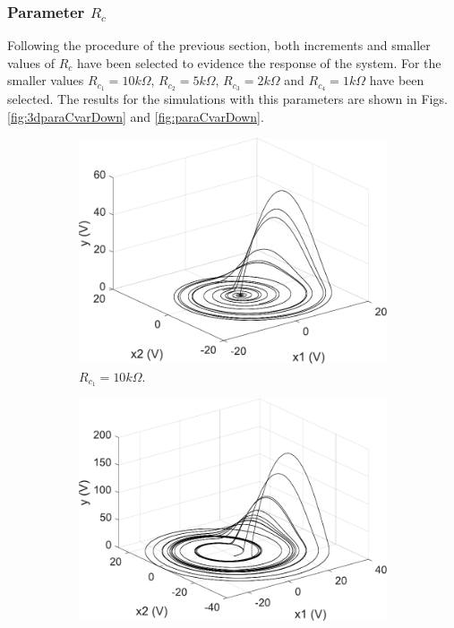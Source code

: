     \subsubsection{Parameter \texorpdfstring{$R_c$}{Rc}}\label{subsubsec:varparaC}
    Following the procedure of the previous section, both increments and smaller values of $R_c$ have been selected to evidence the response of the system. For the smaller values $R_{c_1}=10k\Omega$, $R_{c_2}=5k\Omega$, $R_{c_3}=2k\Omega$ and $R_{c_4}=1k\Omega$ have been selected. The results for the simulations with this parameters are shown in Figs. \ref{fig:3dparaCvarDown} and \ref{fig:paraCvarDown}.
    \begin{figure}
        \centering
        \begin{subfigure}[b]{0.22\textwidth}
            \centering
            \includegraphics[scale=0.28]{figs/paraCdown/3dParaC10.pdf}
            \caption{$R_{c_1} = 10k\Omega$.}    
        \end{subfigure}
        \begin{subfigure}[b]{0.22\textwidth}  
            \centering 
            \includegraphics[scale=0.28]{figs/paraCdown/3dParaC5.pdf}

\end{subfigure}
\end{figure}
